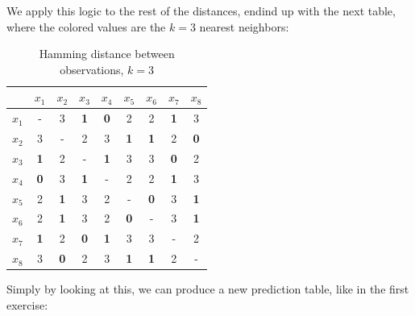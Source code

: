 \documentclass[12pt]{article}
\begin{document}
\begin{enumerate}[leftmargin=\labelsep]
    We apply this logic to the rest of the distances, endind up with the next table, where the colored values are the $k=3$ nearest neighbors:
    \vspace{5pt}
    \begin{table}[H]
        \begin{center}
            \begin{tabular}{c|cccccccc}
            & $x_1$ & $x_2$ & $x_3$ & $x_4$ & $x_5$ & $x_6$ & $x_7$ & $x_8$\\ 
            \hline
                $x_1$ & \-- & 3 & \textbf{\textcolor{codegreen}{1}} & \textbf{\textcolor{codegreen}{0}} & 2 & 2 & \textbf{\textcolor{codepink}{1}} & 3\\ 
                $x_2$ & 3 & \-- & 2 & 3 & \textbf{\textcolor{codepink}{1}} & \textbf{\textcolor{codepink}{1}} & 2 & \textbf{\textcolor{codepink}{0}}\\ 
                $x_3$ & \textbf{\textcolor{codegreen}{1}} & 2 & \-- & \textbf{\textcolor{codegreen}{1}} & 3 & 3 & \textbf{\textcolor{codepink}{0}} & 2\\ 
                $x_4$ & \textbf{\textcolor{codegreen}{0}} & 3 & \textbf{\textcolor{codegreen}{1}} & \-- & 2 & 2 & \textbf{\textcolor{codepink}{1}} & 3\\ 
                $x_5$ & 2 & \textbf{\textcolor{codegreen}{1}} & 3 & 2 & \-- & \textbf{\textcolor{codepink}{0}} & 3 & \textbf{\textcolor{codepink}{1}}\\ 
                $x_6$ & 2 & \textbf{\textcolor{codegreen}{1}} & 3 & 2 & \textbf{\textcolor{codepink}{0}} & \-- & 3 & \textbf{\textcolor{codepink}{1}}\\ 
                $x_7$ & \textbf{\textcolor{codegreen}{1}} & 2 & \textbf{\textcolor{codegreen}{0}} & \textbf{\textcolor{codegreen}{1}} & 3 & 3 & \-- & 2\\ 
                $x_8$ & 3 & \textbf{\textcolor{codegreen}{0}} & 2 & 3 & \textbf{\textcolor{codepink}{1}} & \textbf{\textcolor{codepink}{1}} & 2 & \-- \\ 
            \end{tabular}
            \caption{Hamming distance between observations, $k=3$}
        \end{center}
    \end{table}

    Simply by looking at this, we can produce a new prediction table, like in the first exercise:


\end{enumerate}
\end{document}
